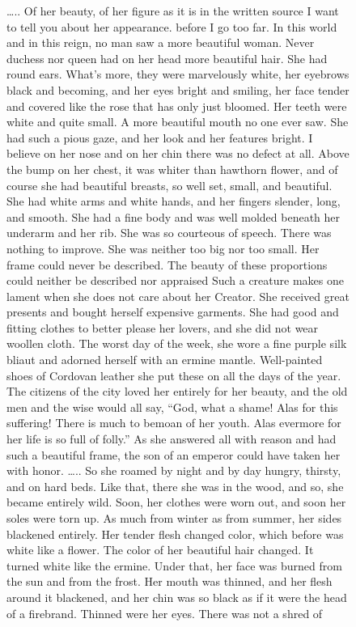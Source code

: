 \documentclass[
  letterpaper,
  DIV=11,
  numbers=noendperiod,
  oneside]{scrreprt}
\begin{document}
\begin{figure}
\ldots.. Of her beauty, of her figure as it is in the written source I
want to tell you about her appearance. before I go too far. In this
world and in this reign, no man saw a more beautiful woman. Never
duchess nor queen had on her head more beautiful hair. She had round
ears. What's more, they were marvelously white, her eyebrows black and
becoming, and her eyes bright and smiling, her face tender and covered
like the rose that has only just bloomed. Her teeth were white and quite
small. A more beautiful mouth no one ever saw. She had such a pious
gaze, and her look and her features bright. I believe on her nose and on
her chin there was no defect at all. Above the bump on her chest, it was
whiter than hawthorn flower, and of course she had beautiful breasts, so
well set, small, and beautiful. She had white arms and white hands, and
her fingers slender, long, and smooth. She had a fine body and was well
molded beneath her underarm and her rib. She was so courteous of speech.
There was nothing to improve. She was neither too big nor too small. Her
frame could never be described. The beauty of these proportions could
neither be described nor appraised Such a creature makes one lament when
she does not care about her Creator. She received great presents and
bought herself expensive garments. She had good and fitting clothes to
better please her lovers, and she did not wear woollen cloth. The worst
day of the week, she wore a fine purple silk bliaut and adorned herself
with an ermine mantle. Well-painted shoes of Cordovan leather she put
these on all the days of the year. The citizens of the city loved her
entirely for her beauty, and the old men and the wise would all say,
``God, what a shame! Alas for this suffering! There is much to bemoan of
her youth. Alas evermore for her life is so full of folly.'' As she
answered all with reason and had such a beautiful frame, the son of an
emperor could have taken her with honor. \ldots.. So she roamed by night
and by day hungry, thirsty, and on hard beds. Like that, there she was
in the wood, and so, she became entirely wild. Soon, her clothes were
worn out, and soon her soles were torn up. As much from winter as from
summer, her sides blackened entirely. Her tender flesh changed color,
which before was white like a flower. The color of her beautiful hair
changed. It turned white like the ermine. Under that, her face was
burned from the sun and from the frost. Her mouth was thinned, and her
flesh around it blackened, and her chin was so black as if it were the
head of a firebrand. Thinned were her eyes. There was not a shred of

\end{figure}
\end{document}
